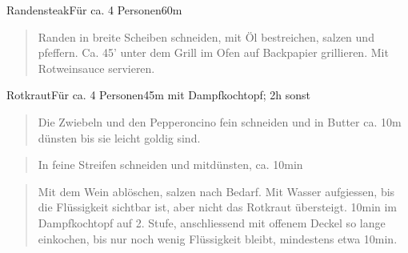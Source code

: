 \documentclass[
  a4paper,
]{article}
\begin{document}
\newpage

\begin{recipe}{Randensteak}{Für ca. 4 Personen}{60m}


\begin{quote}
Randen in breite Scheiben schneiden, mit Öl bestreichen, salzen und
pfeffern. Ca. 45' unter dem Grill im Ofen auf Backpapier grillieren. Mit
Rotweinsauce servieren.
\end{quote}

\freeform\hrulefill\newline\freeform{}\end{recipe}

\newpage

\begin{recipe}{Rotkraut}{Für ca. 4 Personen}{45m mit Dampfkochtopf; 2h sonst}


\begin{quote}
Die Zwiebeln und den Pepperoncino fein schneiden und in Butter ca. 10m
dünsten bis sie leicht goldig sind.
\end{quote}

\freeform\hrulefill


\begin{quote}
In feine Streifen schneiden und mitdünsten, ca. 10min
\end{quote}

\freeform\hrulefill


\begin{quote}
Mit dem Wein ablöschen, salzen nach Bedarf. Mit Wasser aufgiessen, bis
die Flüssigkeit sichtbar ist, aber nicht das Rotkraut übersteigt. 10min
im Dampfkochtopf auf 2. Stufe, anschliessend mit offenem Deckel so lange
einkochen, bis nur noch wenig Flüssigkeit bleibt, mindestens etwa 10min.
\end{quote}

\freeform\hrulefill\newline\freeform{}\end{recipe}

\newpage
\end{document}
